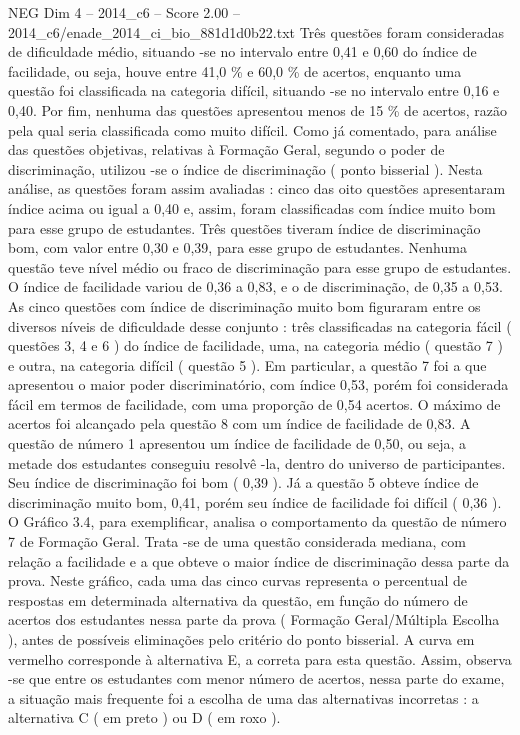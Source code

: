 \begin{textsample}{NEG Dim 4 – 2014\_c6 – Score 2.00 – 2014\_c6/enade\_2014\_ci\_bio\_881d1d0b22.txt}
Três questões foram consideradas de dificuldade médio, situando -se no intervalo entre 0,41 e 0,60 do índice de facilidade, ou seja, houve entre 41,0 \% e 60,0 \% de acertos, enquanto uma questão foi classificada na categoria difícil, situando -se no intervalo entre 0,16 e 0,40.
Por fim, nenhuma das questões apresentou menos de 15 \% de acertos, razão pela qual seria classificada como muito difícil.
Como já comentado, para análise das questões objetivas, relativas à Formação Geral, segundo o poder de discriminação, utilizou -se o índice de discriminação ( ponto bisserial ).
Nesta análise, as questões foram assim avaliadas : cinco das oito questões apresentaram índice acima ou igual a 0,40 e, assim, foram classificadas com índice muito bom para esse grupo de estudantes.
Três questões tiveram índice de discriminação bom, com valor entre 0,30 e 0,39, para esse grupo de estudantes.
Nenhuma questão teve nível médio ou fraco de discriminação para esse grupo de estudantes.
O índice de facilidade variou de 0,36 a 0,83, e o de discriminação, de 0,35 a 0,53.
As cinco questões com índice de discriminação muito bom figuraram entre os diversos níveis de dificuldade desse conjunto : três classificadas na categoria fácil ( questões 3, 4 e 6 ) do índice de facilidade, uma, na categoria médio ( questão 7 ) e outra, na categoria difícil ( questão 5 ).
Em particular, a questão 7 foi a que apresentou o maior poder discriminatório, com índice 0,53, porém foi considerada fácil em termos de facilidade, com uma proporção de 0,54 acertos.
O máximo de acertos foi alcançado pela questão 8 com um índice de facilidade de 0,83.
A questão de número 1 apresentou um índice de facilidade de 0,50, ou seja, a metade dos estudantes conseguiu resolvê -la, dentro do universo de participantes.
Seu índice de discriminação foi bom ( 0,39 ).
Já a questão 5 obteve índice de discriminação muito bom, 0,41, porém seu índice de facilidade foi difícil ( 0,36 ).
O Gráfico 3.4, para exemplificar, analisa o comportamento da questão de número 7 de Formação Geral.
Trata -se de uma questão considerada mediana, com relação a facilidade e a que obteve o maior índice de discriminação dessa parte da prova.
Neste gráfico, cada uma das cinco curvas representa o percentual de respostas em determinada alternativa da questão, em função do número de acertos dos estudantes nessa parte da prova ( Formação Geral/Múltipla Escolha ), antes de possíveis eliminações pelo critério do ponto bisserial.
A curva em vermelho corresponde à alternativa E, a correta para esta questão.
Assim, observa -se que entre os estudantes com menor número de acertos, nessa parte do exame, a situação mais frequente foi a escolha de uma das alternativas incorretas : a alternativa C ( em preto ) ou D ( em roxo ).

\end{textsample}
